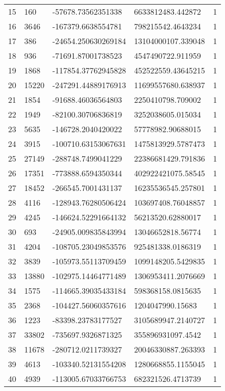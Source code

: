 \begin{longtable}{lllll}
    15 & 160 & -57678.73562351338 & 6633812483.442872 & 1 \\
    16 & 3646 & -167379.6638554781 & 798215542.4643234 & 1 \\
    17 & 386 & -24654.250630269184 & 13104000107.339048 & 1 \\
    18 & 936 & -71691.87001738523 & 4547490722.911959 & 1 \\
    19 & 1868 & -117854.37762945828 & 452522559.43645215 & 1 \\
    20 & 15220 & -247291.44889176913 & 11699557680.638937 & 1 \\
    21 & 1854 & -91688.46036564803 & 2250410798.709002 & 1 \\
    22 & 1949 & -82100.30706836819 & 3252038605.015034 & 1 \\
    23 & 5635 & -146728.2040420022 & 57778982.90688015 & 1 \\
    24 & 3915 & -100710.63153067631 & 1475813929.5787473 & 1 \\
    25 & 27149 & -288748.7499041229 & 22386681429.791836 & 1 \\
    26 & 17351 & -773888.6594350344 & 402922421075.58545 & 1 \\
    27 & 18452 & -266545.7001431137 & 16235536545.257801 & 1 \\
    28 & 4116 & -128943.76280506424 & 103697408.76048857 & 1 \\
    29 & 4245 & -146624.52291664132 & 56213520.62880017 & 1 \\
    30 & 693 & -24905.009835843994 & 13046652818.56774 & 1 \\
    31 & 4204 & -108705.23049853576 & 925481338.0186319 & 1 \\
    32 & 3839 & -105973.55113709459 & 1099148205.5429835 & 1 \\
    33 & 13880 & -102975.14464771489 & 1306953411.2076669 & 1 \\
    34 & 1575 & -114665.39035433184 & 598368158.0815635 & 1 \\
    35 & 2368 & -104427.56060357616 & 1204047990.15683 & 1 \\
    36 & 1223 & -83398.23783177527 & 3105689947.2140727 & 1 \\
    37 & 33802 & -735697.9326871325 & 355896931097.4542 & 1 \\
    38 & 11678 & -280712.0211739327 & 20046330887.263393 & 1 \\
    39 & 4613 & -103340.52131554208 & 1280668855.1155045 & 1 \\
    40 & 4939 & -113005.67033766753 & 682321526.4713739 & 1 \\

\end{longtable}
